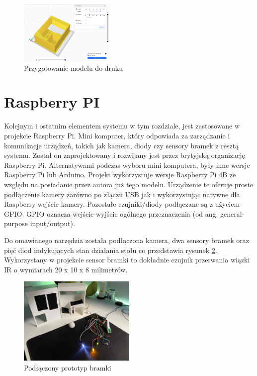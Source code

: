 \begin{figure}[h!]
  \centering
    \includegraphics[width=0.4\textwidth]{images/3D/cura_gate.png}
  \caption{Przygotowanie modelu do druku}
  \label{fig:cura-file-preparation}
\end{figure}

\label{ch:hardware:raspberrypi}
\section{Raspberry PI}
Kolejnym i ostatnim elementem systemu w tym rozdziale, jest zastosowane w projekcie Raspberry Pi. Mini komputer, który odpowiada za zarządzanie i komunikacje urządzeń, takich jak kamera, diody czy sensory bramek z resztą systemu. Został on zaprojektowany i rozwijany jest przez brytyjską organizację Raspberry Pi. Alternatywami podczas wyboru mini komputera, były inne wersje Raspberry Pi lub Arduino. Projekt wykorzystuje wersje Raspberry Pi 4B ze względu na posiadanie przez autora już tego modelu. Urządzenie te oferuje proste podłączenie kamery zarówno po złączu USB jak i wykorzystując natywne dla Raspberry wejście kamery. Pozostałe czujniki/diody podłączane są z użyciem GPIO. GPIO oznacza wejście-wyjście ogólnego przeznaczenia (od ang. general-purpose input/output).

Do omawianego narzędzia została podłączona kamera, dwa sensory bramek oraz pięć diod indykujących stan działania stołu co przedstawia rysunek \ref{fig:connected-gate}. Wykorzystany w projekcie sensor bramki to dokładnie czujnik przerwania wiązki IR o wymiarach 20 x 10 x 8 milimetrów.

\begin{figure}[h!]
  \centering
    \includegraphics[width=0.5\textwidth]{images/hardware/prototyp-bramki.jpg}
  \caption{Podłączony prototyp bramki}
  \label{fig:connected-gate}
\end{figure}